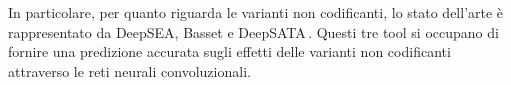In particolare, per quanto riguarda le varianti non codificanti, lo stato dell'arte è rappresentato da DeepSEA, Basset e DeepSATA\,\cite{zhou2015predicting, kelley2016basset, ma2023deepsata}. Questi tre tool si occupano di fornire una predizione accurata sugli effetti delle varianti non codificanti attraverso le reti neurali convoluzionali.




